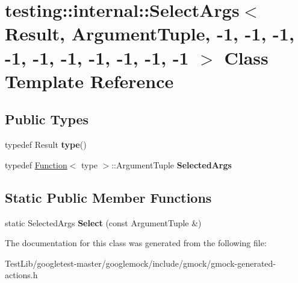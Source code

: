 \hypertarget{classtesting_1_1internal_1_1SelectArgs_3_01Result_00_01ArgumentTuple_00_01-1_00_01-1_00_01-1_00_d26521468f85209f6b4c61eca65baf5d}{}\section{testing\+:\+:internal\+:\+:Select\+Args$<$ Result, Argument\+Tuple, -\/1, -\/1, -\/1, -\/1, -\/1, -\/1, -\/1, -\/1, -\/1, -\/1 $>$ Class Template Reference}
\label{classtesting_1_1internal_1_1SelectArgs_3_01Result_00_01ArgumentTuple_00_01-1_00_01-1_00_01-1_00_d26521468f85209f6b4c61eca65baf5d}
\subsection*{Public Types}
\begin{DoxyCompactItemize}
\item 
\mbox{\label{classtesting_1_1internal_1_1SelectArgs_3_01Result_00_01ArgumentTuple_00_01-1_00_01-1_00_01-1_00_d26521468f85209f6b4c61eca65baf5d_a1630336a54c2407c1046bd1158a19569}} 
typedef Result {\bfseries type}()
\item 
\mbox{\label{classtesting_1_1internal_1_1SelectArgs_3_01Result_00_01ArgumentTuple_00_01-1_00_01-1_00_01-1_00_d26521468f85209f6b4c61eca65baf5d_a51990aecfbd69bd557cabd6798fae384}} 
typedef \hyperlink{structtesting_1_1internal_1_1Function}{Function}$<$ type $>$\+::Argument\+Tuple {\bfseries Selected\+Args}
\end{DoxyCompactItemize}
\subsection*{Static Public Member Functions}
\begin{DoxyCompactItemize}
\item 
\mbox{\label{classtesting_1_1internal_1_1SelectArgs_3_01Result_00_01ArgumentTuple_00_01-1_00_01-1_00_01-1_00_d26521468f85209f6b4c61eca65baf5d_a3006d06399412a67f576dca100f3a830}} 
static Selected\+Args {\bfseries Select} (const Argument\+Tuple \&)
\end{DoxyCompactItemize}


The documentation for this class was generated from the following file\+:\begin{DoxyCompactItemize}
\item 
Test\+Lib/googletest-\/master/googlemock/include/gmock/gmock-\/generated-\/actions.\+h\end{DoxyCompactItemize}

